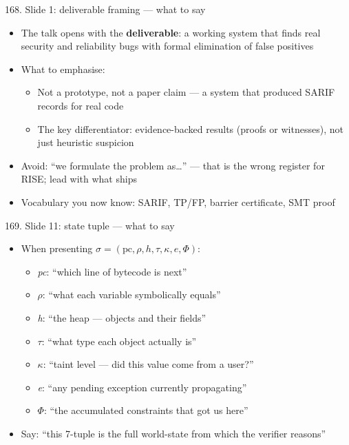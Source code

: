 \documentclass[aspectratio=169]{beamer}
\begin{document}
\begin{frame}{168. Slide 1: deliverable framing --- what to say}
\begin{itemize}
  \item The talk opens with the \textbf{deliverable}: a working system that finds real security and reliability bugs with formal elimination of false positives
  \item What to emphasise:
    \begin{itemize}
      \item Not a prototype, not a paper claim --- a system that produced SARIF records for real code
      \item The key differentiator: evidence-backed results (proofs or witnesses), not just heuristic suspicion
    \end{itemize}
  \item Avoid: ``we formulate the problem as\ldots'' --- that is the wrong register for RISE; lead with what ships
  \item Vocabulary you now know: SARIF, TP/FP, barrier certificate, SMT proof
\end{itemize}
\end{frame}

\begin{frame}{169. Slide 11: state tuple --- what to say}
\begin{itemize}
  \item When presenting \(\sigma = (\text{pc}, \rho, h, \tau, \kappa, e, \Phi)\):
    \begin{itemize}
      \item \textit{pc}: ``which line of bytecode is next''
      \item \textit{$\rho$}: ``what each variable symbolically equals''
      \item \textit{h}: ``the heap --- objects and their fields''
      \item \textit{$\tau$}: ``what type each object actually is''
      \item \textit{$\kappa$}: ``taint level --- did this value come from a user?''
      \item \textit{e}: ``any pending exception currently propagating''
      \item \textit{$\Phi$}: ``the accumulated constraints that got us here''
    \end{itemize}
  \item Say: ``this 7-tuple is the full world-state from which the verifier reasons''
\end{itemize}
\end{frame}
\end{document}

